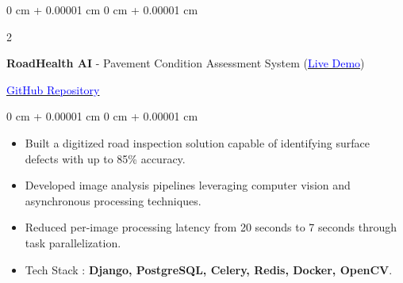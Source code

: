 \documentclass[10pt, letterpaper]{article}
\newenvironment{highlights}{
    \begin{itemize}[
        topsep=0.10 cm,
        parsep=0.10 cm,
        partopsep=0pt,
        itemsep=0pt,
        leftmargin=0.4 cm + 10pt
    ]
}{
    \end{itemize}
} %
\newenvironment{onecolentry}{
    \begin{adjustwidth}{
        0 cm + 0.00001 cm
    }{
        0 cm + 0.00001 cm
    }
}{
    \end{adjustwidth}
} %
\newenvironment{twocolentry}[2][]{
    \onecolentry
    \def\secondColumn{#2}
    \setcolumnwidth{\fill, 4.5 cm}
    \begin{paracol}{2}
}{
    \switchcolumn \raggedleft \secondColumn
    \end{paracol}
    \endonecolentry
} %
\begin{document}
\vspace{0.3 cm}
\begin{twocolentry}{\href{https://github.com/vamsi-lpu18/RoadHealth-AI-Automated-Pavement-Condition-Assessment-from-Photographs}{\textcolor{blue}{GitHub Repository}}}
    \textbf{RoadHealth AI} - Pavement Condition Assessment System
    (\href{https://roadhealth-ai-automated-pavement.onrender.com/}{\textcolor{blue}{Live Demo}})
\end{twocolentry}
\vspace{0.2cm}
\begin{onecolentry}
    \begin{highlights}
        \item Built a digitized road inspection solution capable of identifying surface defects with up to 85\% accuracy.
        \item Developed image analysis pipelines leveraging computer vision and asynchronous processing techniques.
        \item Reduced per-image processing latency from 20 seconds to 7 seconds through task parallelization.
        \item Tech Stack : \textbf{Django, PostgreSQL, Celery, Redis, Docker, OpenCV}.
    \end{highlights}
\end{onecolentry}
\end{document}
